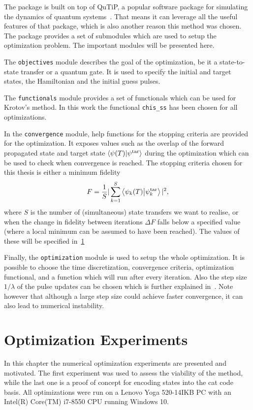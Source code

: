 \documentclass[main.tex]{subfiles}
\begin{document}
The package is built on top of QuTiP, a popular software package for simulating the dynamics of quantum systems~\cite{johansson_qutip_2013}.
That means it can leverage all the useful features of that package, which is also another reason this method was chosen.
The package provides a set of submodules which are used to setup the optimization problem.
The important modules will be presented here.

The \texttt{objectives} module describes the goal of the optimization, be it a state-to-state transfer or a quantum gate.
It is used to specify the initial and target states, the Hamiltonian and the initial guess pulses.

The \texttt{functionals} module provides a set of functionals which can be used for Krotov's method.
In this work the functional \texttt{chis\_ss} has been chosen for all optimizations.

In the \texttt{convergence} module, help functions for the stopping criteria are provided for the optimization.
It exposes values such as the overlap of the forward propagated state and target state \(\braket{\psi(T)}{\psi^{\text{tar}}}\) during the optimization which can be used to check when convergence is reached.
The stopping criteria chosen for this thesis is either a minimum fidelity~\cite{ofek_extending_2016}
\begin{equation}
    F = \frac{1}{S}|\sum_{k=1}^{S} \braket{\psi_k(T)}{\psi_{k}^{\text{tar}}}|^2,
    \label{eq:total-fidelity}
\end{equation}
where \(S\) is the number of (simultaneous) state transfers we want to realise, or when the change in fidelity between iterations \(\Delta F\) falls below a specified value (where a local minimum can be assumed to have been reached).
The values of these will be specified in~\cref{sec:optimization-experiments}

Finally, the \texttt{optimization} module is used to setup the whole optimization.
It is possible to choose the time discretization, convergence criteria, optimization functional, and a function which will run after every iteration.
Also the step size \(1/\lambda\) of the pulse updates can be chosen which is further explained in~\cite{goerz_krotov:_2019}.
Note however that although a large step size could achieve faster convergence, it can also lead to numerical instability.

\section{Optimization Experiments}
\label{sec:optimization-experiments}
In this chapter the numerical optimization experiments are presented and motivated.
The first experiment was used to assess the viability of the method, while the last one is a proof of concept for encoding states into the cat code basis.
All optimizations were run on a Lenovo Yoga 520-14IKB PC with an Intel(R) Core(TM) i7-8550 CPU running Windows 10.
\end{document}
